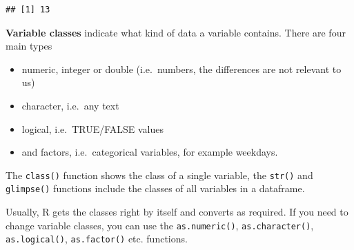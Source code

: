 \documentclass[
]{book}
\newenvironment{Shaded}{\begin{snugshade}}{\end{snugshade}}
\newcommand{\CommentTok}[1]{\textcolor[rgb]{0.56,0.35,0.01}{\textit{#1}}}
\newcommand{\DataTypeTok}[1]{\textcolor[rgb]{0.13,0.29,0.53}{#1}}
\newcommand{\DecValTok}[1]{\textcolor[rgb]{0.00,0.00,0.81}{#1}}
\newcommand{\KeywordTok}[1]{\textcolor[rgb]{0.13,0.29,0.53}{\textbf{#1}}}
\newcommand{\NormalTok}[1]{#1}
\newcommand{\OperatorTok}[1]{\textcolor[rgb]{0.81,0.36,0.00}{\textbf{#1}}}
\newcommand{\StringTok}[1]{\textcolor[rgb]{0.31,0.60,0.02}{#1}}
\providecommand{\tightlist}{%
  \setlength{\itemsep}{0pt}\setlength{\parskip}{0pt}}
\begin{document}
\begin{Shaded}
\end{Shaded}

\begin{verbatim}
## [1] 13
\end{verbatim}

\textbf{Variable classes} indicate what kind of data a variable contains. There are four main types

\begin{itemize}
\tightlist
\item
  numeric, integer or double (i.e.~numbers, the differences are not relevant to us)
\item
  character, i.e.~any text
\item
  logical, i.e.~TRUE/FALSE values
\item
  and factors, i.e.~categorical variables, for example weekdays.
\end{itemize}

The \texttt{class()} function shows the class of a single variable, the \texttt{str()} and \texttt{glimpse()} functions include the classes of all variables in a dataframe.

Usually, R gets the classes right by itself and converts as required. If you need to change variable classes, you can use the \texttt{as.numeric()}, \texttt{as.character()}, \texttt{as.logical()}, \texttt{as.factor()} etc. functions.
\end{document}

